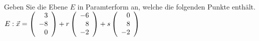 \begin{aufgabe} ~ \\ 
Geben Sie die Ebene $E$ in Paramterform an, welche die folgenden Punkte enthält.$E: \vec{x}=\Vekd{3}{-8}{0} + r\Vekd{-6}{8}{-2}+ s\Vekd{0}{8}{-2}$\end{aufgabe} 
